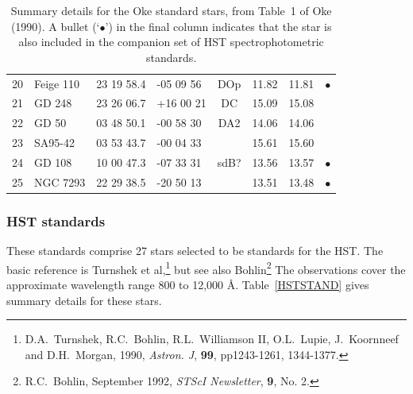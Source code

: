 \documentclass[11pt,twoside]{article}
\begin{document}
\begin{table}[htbp]
\begin{center}
\begin{tabular}{clllcccc}
20 & Feige 110   & 23 19 58.4  & -05 09 56  & DOp  & 11.82  & 11.81 & $\bullet$ \\
21 & GD 248      & 23 26 06.7  & +16 00 21  & DC   & 15.09  & 15.08 & \\
22 & GD 50       & 03 48 50.1  & -00 58 30  & DA2  & 14.06  & 14.06 & \\
23 & SA95-42     & 03 53 43.7  & -00 04 33  &      & 15.61  & 15.60 & \\
24 & GD 108      & 10 00 47.3  & -07 33 31  & sdB? & 13.56  & 13.57 & $\bullet$ \\
25 & NGC 7293    & 22 29 38.5  & -20 50 13  &      & 13.51  & 13.48 & $\bullet$ \\
\end{tabular}
\end{center}

\begin{quote}
\caption{Summary details for the Oke standard stars, from Table~1 of Oke
(1990).  A bullet (`$\bullet$') in the final column indicates that the star
is also included in the companion set of HST spectrophotometric standards.
\label{OKESTAND} }
\end{quote}

\end{table}

\subsubsection{HST standards}

   These standards comprise 27 stars selected to be standards for the
   HST.  The basic reference is Turnshek et al,\footnote{D.A.~Turnshek,
   R.C.~Bohlin, R.L.~Williamson II, O.L.~Lupie, J.~Koornneef and
   D.H.~Morgan, 1990, {\it Astron. J}, {\bf 99}, pp1243-1261, 1344-1377.}
   but see also Bohlin\footnote{R.C.~Bohlin, September 1992, {\it STScI
   Newsletter}, {\bf 9}, No. 2.}  The observations cover the approximate
   wavelength range 800 to 12,000 \AA .  Table~\ref{HSTSTAND} gives
   summary details for these stars.
\end{document}
